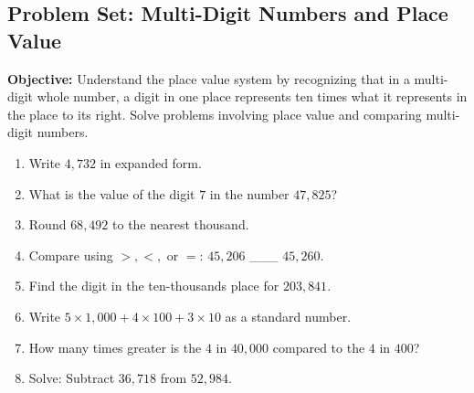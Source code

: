 \documentclass[12pt]{article}
\title{}
\date{}
\begin{document}
\subsection*{Problem Set: Multi-Digit Numbers and Place Value}
\onehalfspacing

\begin{tcolorbox}[colframe=black!40, colback=gray!5, 
coltitle=black, colbacktitle=black!20, fonttitle=\bfseries\Large, 
title=Learning Objective, halign title=center, left=5pt, right=5pt, top=5pt, bottom=15pt]
\textbf{Objective:} Understand the place value system by recognizing that in a multi-digit whole number, a digit in one place represents ten times what it represents in the place to its right. Solve problems involving place value and comparing multi-digit numbers.
\end{tcolorbox}

\begin{tcolorbox}[colframe=black!60, colback=white, 
coltitle=black, colbacktitle=black!15, fonttitle=\bfseries\Large, 
title=Exercises, halign title=center, left=10pt, right=10pt, top=10pt, bottom=10pt]
\begin{enumerate}[itemsep=2em]
    \item Write \( 4,732 \) in expanded form.
    \item What is the value of the digit \( 7 \) in the number \( 47,825 \)?
    \item Round \( 68,492 \) to the nearest thousand.
    \item Compare using \( >, <, \) or \( = \): \( 45,206 \) \_\_\_ \( 45,260 \).
    \item Find the digit in the ten-thousands place for \( 203,841 \).
    \item Write \( 5 \times 1,000 + 4 \times 100 + 3 \times 10 \) as a standard number.
    \item How many times greater is the \( 4 \) in \( 40,000 \) compared to the \( 4 \) in \( 400 \)?
    \item Solve: Subtract \( 36,718 \) from \( 52,984 \).
    \vspace{2cm}
\end{enumerate}
\end{tcolorbox}

\vspace{1em}
\end{document}
